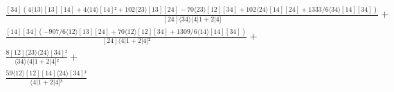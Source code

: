 \documentclass[varwidth, border=5pt]{standalone}
\begin{document}
\begin{my}
$\begin{gathered}
\scriptscriptstyle\frac{[34](4⟨13⟩[13][14]+4⟨14⟩[14]²+102⟨23⟩[13][24]-70⟨23⟩[12][34]+102⟨24⟩[14][24]+1333/6⟨34⟩[14][34])}{[24]⟨34⟩⟨4|1+2|4]} +\\
\scriptscriptstyle\frac{[14][34](-907/6⟨12⟩[13][24]+70⟨12⟩[12][34]+1309/6⟨14⟩[14][34])}{[24]⟨4|1+2|4]²} +\\
\scriptscriptstyle\frac{8[12]⟨23⟩⟨24⟩[34]²}{⟨34⟩⟨4|1+2|4]²} +\\
\scriptscriptstyle\frac{59⟨12⟩[12][14]⟨24⟩[34]²}{⟨4|1+2|4]³} \phantom{+}
\end{gathered}$
\end{my}
\end{document}
